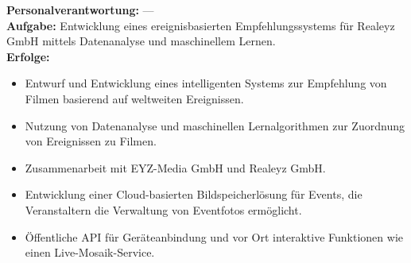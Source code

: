 \documentclass[10pt,a4paper,normalphoto]{altacv}
\begin{document}
\begin{fullwidth}
\vspace{1em}


\vspace{2em}

\textbf{Personalverantwortung:} —\\
\textbf{Aufgabe:} Entwicklung eines ereignisbasierten Empfehlungssystems für Realeyz GmbH mittels Datenanalyse und maschinellem Lernen.\\
\textbf{Erfolge:}
\begin{itemize}
    \item Entwurf und Entwicklung eines intelligenten Systems zur Empfehlung von Filmen basierend auf weltweiten Ereignissen.
    \item Nutzung von Datenanalyse und maschinellen Lernalgorithmen zur Zuordnung von Ereignissen zu Filmen.
    \item Zusammenarbeit mit EYZ-Media GmbH und Realeyz GmbH.
\end{itemize}

\vspace{1em}


\vspace{2em}


\begin{itemize}
    \item Entwicklung einer Cloud-basierten Bildspeicherlösung für Events, die Veranstaltern die Verwaltung von Eventfotos ermöglicht.
    \item Öffentliche API für Geräteanbindung und vor Ort interaktive Funktionen wie einen Live-Mosaik-Service.
\end{itemize}

\vspace{1em}



\end{fullwidth}
\end{document}
